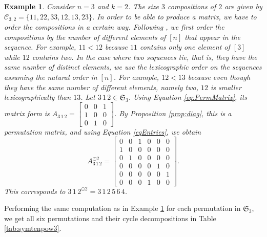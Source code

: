 \documentclass[12pt]{amsart}
\newtheorem{example}{Example}{}
\begin{document}
\begin{example}
    \label{ex:matrix1}
    Consider $n=3$ and $k=2$. The size $3$ compositions of $2$ are given by $\mathcal{C}_{3,2} = \{11,22,33,12,13,23\}$. In order to be able to produce a matrix, we have to order the compositions in a certain way. Following \cite{AstaizaetAl2026}, we first order the compositions by the number of different elements of $[n]$ that appear in the sequence. For example, $11<12$ because $11$ contains only one element of $[3]$ while $12$ contains two. In the case where two sequences tie, that is, they have the same number of distinct elements, we use the lexicographic order on the sequences assuming the natural order in $[n]$. For example, $12<13$ because even though they have the same number of different elements, namely two, $12$ is smaller lexicographically than $13$.  Let  $3\,1\,2 \in \mathfrak{S}_3$. Using Equation \ref{eq:PermMatrix}, its matrix form is $A_{3\,1\,2 } = \left [ \begin{matrix}
        0&0&1\\
        1&0&0\\
        0&1&0
    \end{matrix}\right ]$. By Proposition \ref{prop:diag}, this is a permutation matrix, and using Equation \ref{eqEntries}, we obtain 
\begin{equation*}
    A_{3\,1\,2}^{\odot 2}= \left [\begin{matrix}
        0&0&1&0&0&0\\
1&0&0&0&0&0\\
0&1&0&0&0&0\\
0&0&0&0&1&0\\
0&0&0&0&0&1\\
0&0&0&1&0&0
    \end{matrix} \right ].
\end{equation*}
 This corresponds to  ${3\,1\,2} ^{\odot 2} = 3\,1\,2\,5\,6\,4$.
\end{example}
Performing the same computation as in Example \ref{ex:matrix1} for each permutation in $\mathfrak{S}_3$, we get all six permutations and their cycle decompositions in Table \ref{tab:symtenpow3}.
\end{document}
